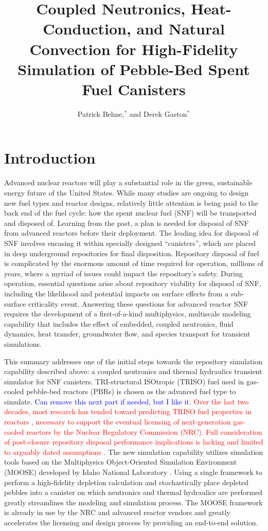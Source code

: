 \documentclass{anstrans}
\title{Coupled Neutronics, Heat-Conduction, and Natural Convection for High-Fidelity Simulation of Pebble-Bed Spent Fuel Canisters}
\author{Patrick Behne,$^{*}$ and Derek Gaston$^{*}$}
\institute{
$^{*}$Computational Frameworks Group, Idaho National Laboratory, 1955 N. Fremont Ave.
Idaho Falls, ID 83415, patrick.behne@inl.gov, derek.gaston@inl.gov
}
\newcommand{\red}[1]{\textcolor{red}{#1}}
\newcommand{\blue}[1]{\textcolor{blue}{#1}}
\begin{document}
\section{Introduction}

Advanced nuclear reactors will play a substantial role in the green, sustainable energy future of the United States.
While many studies are ongoing to design new fuel types and reactor designs, relatively little attention is being paid to the back end of the fuel cycle: how the spent nuclear fuel (SNF) will be transported and disposed of.
Learning from the past, a plan is needed for disposal of SNF from advanced reactors before their deployment.
The leading idea for disposal of SNF involves encasing it within specially designed ``canisters'', which are placed in deep underground repositories for final disposition.
Repository disposal of fuel is complicated by the enormous amount of time required for operation, millions of years, where a myriad of issues could impact the repository's safety.
During operation, essential questions arise about repository viability for disposal of SNF, including the likelihood and potential impacts on surface effects from a sub-surface criticality event.
Answering these questions for advanced reactor SNF requires the development of a first-of-a-kind multiphysics, multiscale modeling capability that includes the effect of embedded, coupled neutronics, fluid dynamics, heat transfer, groundwater flow, and species transport for transient simulations.

This summary addresses one of the initial steps towards the repository simulation capability described above: a coupled neutronics and thermal hydraulics transient simulator for SNF canisters.
TRI-structural ISOtropic (TRISO) fuel used in gas-cooled pebble-bed reactors (PBRs) is chosen as the advanced fuel type to simulate.
\blue{Can remove this next part if needed, but I like it.}
\red{
Over the last two decades, most research has tended toward predicting TRISO fuel properties in reactors \cite{nureg, epri}, necessary to support the eventual licensing of next-generation gas-cooled reactors by the Nuclear Regulatory Commission (NRC).
Full consideration of post-closure repository disposal performance implications is lacking and limited to arguably dated assumptions \cite{gt-mhr, PETERSON2011}.
}
The new simulation capability utilizes simulation tools based on the Multiphysics Object-Oriented Simulation Environment (MOOSE) developed by Idaho National Laboratory \cite{moose}.
Using a single framework to perform a high-fidelity depletion calculation and stochastically place depleted pebbles into a canister on which neutronics and thermal hydraulics are performed greatly streamlines the modeling and simulation process.
The MOOSE framework is already in use by the NRC and advanced reactor vendors and greatly accelerates the licensing and design process by providing an end-to-end solution.
\end{document}
